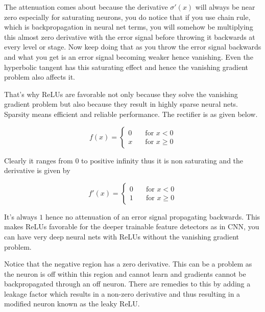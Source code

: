 \documentclass{article}
\begin{document}
The attenuation comes about because the derivative $\sigma'(x)$ will always be near zero especially for saturating neurons, you do notice that if you use chain rule, which is backpropagation in neural net terms, you will somehow be multiplying this almost zero derivative with the error signal before throwing it backwards at every level or stage. Now keep doing that as you throw the error signal backwards and what you get is an error signal becoming weaker hence vanishing. Even the hyperbolic tangent has this saturating effect and hence the vanishing gradient problem also affects it.

That's why ReLUs are favorable not only because they solve the vanishing gradient problem but also because they result in highly sparse neural nets. Sparsity means efficient and reliable performance. The rectifier is as given below.

\[ f(x) = 
\begin{cases}
    0  & \quad \text{for } x < 0\\
    x  & \quad \text{for } x \geq 0
  \end{cases}
\]

Clearly it ranges from 0 to positive infinity thus it is non saturating and the derivative is given by

\[ f'(x) = 
\begin{cases}
    0  & \quad \text{for } x < 0\\
    1  & \quad \text{for } x \geq 0
  \end{cases}
\]


It's always $1$ hence no attenuation of an error signal propagating backwards. This makes ReLUs favorable for the deeper trainable feature detectors as in CNN, you can have very deep neural nets with ReLUs without the vanishing gradient problem.

Notice that the negative region has a zero derivative. This can be a problem as the neuron is off within this region and cannot learn and gradients cannot be backpropagated through an off neuron. There are remedies to this by adding a leakage factor which results in a non-zero derivative and thus resulting in a modified neuron known as the leaky ReLU.
\end{document}
